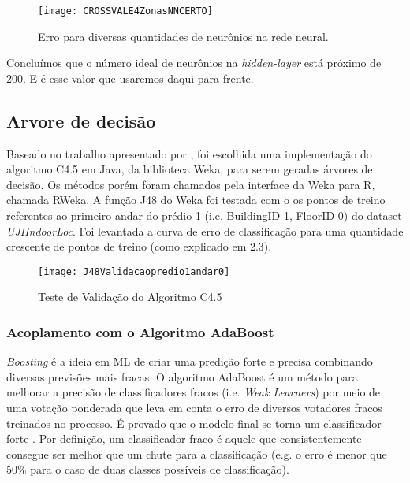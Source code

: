 \begin{figure}[!ht]
	\centering
	\caption{Erro para diversas quantidades de neurônios na rede neural.}
  \texttt{[image: CROSSVALE4ZonasNNCERTO]}
\label{fig:crossNN}  

\end{figure}




Concluímos que o número ideal de neurônios na  \textit{hidden-layer} está próximo de 200. E é esse valor que usaremos daqui para frente.

\subsection{Arvore de decisão}


Baseado no trabalho apresentado por \cite{comparative}, foi escolhida uma implementação do algoritmo C4.5 \cite{quinlan} em Java, da biblioteca Weka, para serem geradas árvores de decisão. Os métodos porém foram chamados pela interface da Weka para R, chamada RWeka.
A função J48 do Weka foi testada com o os pontos de treino referentes ao primeiro andar do prédio 1 (i.e. BuildingID 1, FloorID 0)  do dataset \textit{UJIIndoorLoc}. Foi levantada a curva de erro de classificação para uma quantidade crescente de pontos de treino (como explicado em 2.3).


\begin{figure}[H]
\centering
\caption{Teste de Validação do Algoritmo C4.5}
 \texttt{[image: J48Validacaopredio1andar0]}
\label{fig:euclidian}  
\end{figure}

\subsubsection{Acoplamento com o Algoritmo AdaBoost}




\textit{Boosting} é a ideia em ML de criar uma predição forte e precisa combinando diversas previsões mais fracas. O algoritmo AdaBoost \cite{adaboost} é um método para melhorar a precisão de classificadores fracos (i.e. \textit{Weak Learners}) por meio de uma votação ponderada que leva em conta o erro de diversos votadores fracos treinados no processo. É provado que o modelo final se torna um classificador forte \cite{explainingadaboost}. Por definição, um classificador fraco é aquele que consistentemente consegue ser melhor que um chute para a classificação (e.g. o erro é menor que 50\% para o caso de duas classes possíveis de classificação).


